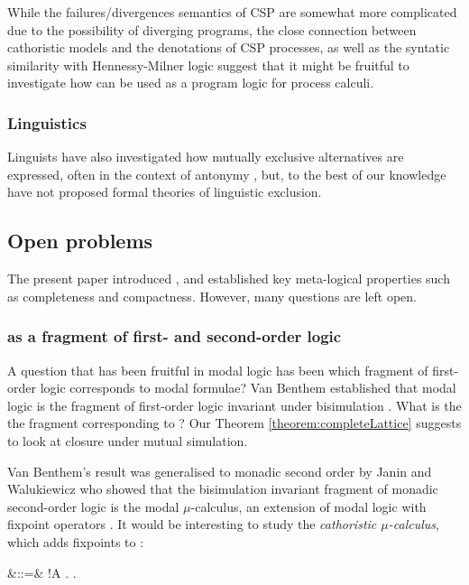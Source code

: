 While the failures/divergences semantics of CSP are somewhat more
complicated due to the possibility of diverging programs, the close
connection between cathoristic models and the denotations of CSP processes,
as well as the syntatic similarity with Hennessy-Milner logic suggest
that it might be fruitful to investigate how \cathoristic{} can be used
as a program logic for process calculi.

\subsubsection{Linguistics}

Linguists have also investigated how mutually exclusive alternatives
are expressed, often in the context of antonymy
\cite{OKeeffeA:rouhanocl,AronoffM:hanlin,AllanK:conencos}, but, to the
best of our knowledge have not proposed formal theories of linguistic
exclusion.

\subsection{Open problems} 

The present paper introduced \cathoristic{}, and established key
meta-logical properties such as completeness and compactness. However,
many questions are left open. 

\subsubsection{\Cathoristic{} as a fragment of first- and second-order logic }

A question that has been fruitful in modal logic has been which
fragment of first-order logic corresponds to modal formulae?  Van
Benthem established that modal logic is the fragment of first-order
logic invariant under bisimulation \cite{BlackburnP:modlog}. What is
the the fragment corresponding to \cathoristic{}? Our Theorem
\ref{theorem:completeLattice} suggests to look at closure under mutual
simulation.  

Van Benthem's result was generalised to monadic second
order by Janin and Walukiewicz \cite{JaninD:expcomotpmcwrtmsol} who
showed that the bisimulation invariant fragment of monadic
second-order logic is the modal $\mu$-calculus, an extension of modal
logic with fixpoint operators \cite{KozenD:respromc}.  It would be
interesting to study the \emph{cathoristic $\mu$-calculus}, which adds
fixpoints to \cathoristic{}:
\begin{GRAMMAR}
  \phi
     &::=&
  \TRUE
     \VERTICAL
  \phi \AND \psi
     \VERTICAL
  \phi
     \VERTICAL
  !A
     \VERTICAL
  \mu {}.\phi
     \VERTICAL
  \nu {}.\phi
     \VERTICAL
\end{GRAMMAR}

